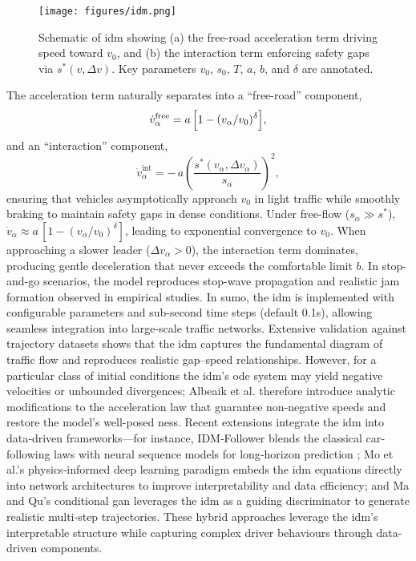 \begin{figure}
  \centering
  \texttt{[image: figures/idm.png]}
  \caption{Schematic of \ac{idm} showing (a) the free-road acceleration term driving speed toward \(v_0\), and (b) the interaction term enforcing safety gaps via \(s^*(v,\Delta v)\). Key parameters \(v_0\), \(s_0\), \(T\), \(a\), \(b\), and \(\delta\) are annotated.}
  \label{fig:2d_idm}
\end{figure}

The acceleration term naturally separates into a “free-road” component,
\[
\dot{v}^\mathrm{free}_\alpha = a\,\Bigl[1 - (v_\alpha / v_0)^\delta\Bigr],
\]
and an “interaction” component,
\[
\dot{v}^\mathrm{int}_\alpha = -\,a\left(\frac{s^*(v_\alpha,\Delta v_\alpha)}{s_\alpha}\right)^2,
\]
ensuring that vehicles asymptotically approach $v_0$ in light traffic while smoothly braking to maintain safety gaps in dense conditions.
\mynewline
Under free-flow ($s_\alpha\gg s^*$), $\dot{v}_\alpha\approx a\,[1-(v_\alpha/v_0)^\delta]$, leading to exponential convergence to $v_0$. When approaching a slower leader ($\Delta v_\alpha>0$), the interaction term dominates, producing gentle deceleration that never exceeds the comfortable limit $b$. In stop-and-go scenarios, the model reproduces stop-wave propagation and realistic jam formation observed in empirical studies. \cite{Treiber_2000}
\mynewline
In \ac{sumo}, the \ac{idm} is implemented with configurable parameters and sub-second time steps (default 0.1s), allowing seamless integration into large-scale traffic networks. \cite{Krajzewicz2002}
\mynewline
Extensive validation against trajectory datasets shows that the \ac{idm} captures the fundamental diagram of traffic flow and reproduces realistic gap–speed relationships. \cite{Treiber_2000, Kesting_2008, TREIBER2013922} However, for a particular class of initial conditions the \ac{idm}’s \ac{ode} system may yield negative velocities or unbounded divergences; Albeaik et al. \cite{Albeaik2022} therefore introduce analytic modifications to the acceleration law that guarantee non-negative speeds and restore the model’s well-posed ness.
Recent extensions integrate the \ac{idm} into data‐driven frameworks—for instance, IDM‐Follower blends the classical car‐following laws with neural sequence models for long‐horizon prediction \cite{IDM_Wang2022}; Mo et al.’s \cite{Mo2020PIDL} physics‐informed deep learning paradigm embeds the \ac{idm} equations directly into network architectures to improve interpretability and data efficiency; and Ma and Qu’s \cite{MaQu2023} conditional \ac{gan} leverages the \ac{idm} as a guiding discriminator to generate realistic multi‐step trajectories. These hybrid approaches leverage the \ac{idm}’s interpretable structure while capturing complex driver behaviours through data-driven components.


